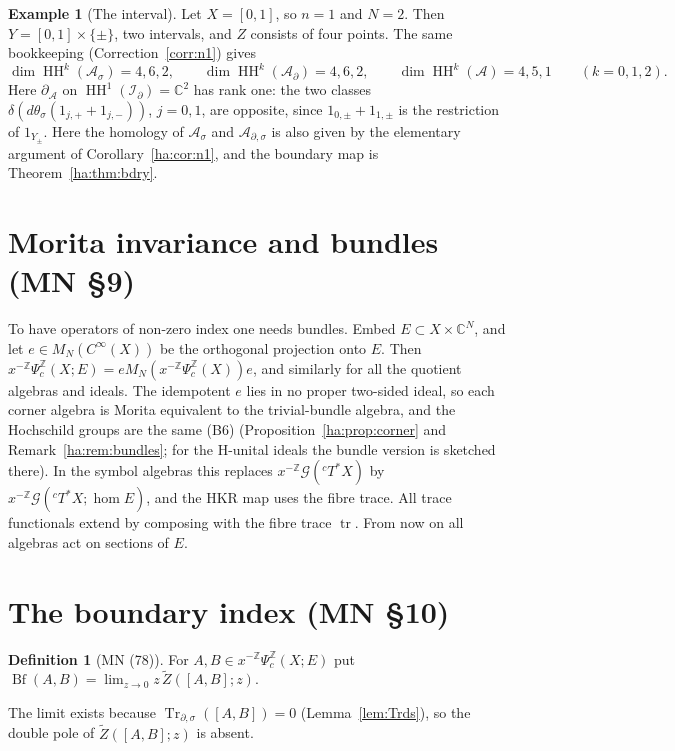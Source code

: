 \documentclass[11pt,oneside,reqno]{article}
\DeclareMathOperator{\HH}{HH}
\DeclareMathOperator{\Tr}{Tr}
\DeclareMathOperator{\tr}{tr}
\DeclareMathOperator{\Bf}{Bf}
\newcommand{\C}{\mathbb C}
\newcommand{\Z}{\mathbb Z}
\newcommand{\cA}{\mathcal A}
\newcommand{\Id}{\mathcal I_\partial}
\newcommand{\As}{\mathcal A_\sigma}
\newcommand{\Ad}{\mathcal A_\partial}
\newcommand{\Ads}{\mathcal A_{\partial,\sigma}}
\newcommand{\Psic}{\Psi_{c}}
\newcommand{\Trds}{\Tr_{\partial,\sigma}}
\newcommand{\CI}{C^\infty}
\newcommand{\cT}{{}^cT^*X}
\theoremstyle{plain}
\theoremstyle{definition}
\newtheorem{definition}[theorem]{Definition}
\newtheorem{example}[theorem]{Example}
\theoremstyle{remark}
\begin{document}
\begin{example}[The interval]\label{ex:intervalHH}
Let \(X=[0,1]\), so \(n=1\) and \(N=2\). Then \(Y=[0,1]\times\{\pm\}\), two
intervals, and \(Z\) consists of four points. The same bookkeeping
(Correction~\ref{corr:n1}) gives
\[
 \dim\HH^k(\As)=4,6,2,\qquad\dim\HH^k(\Ad)=4,6,2,\qquad
 \dim\HH^k(\cA)=4,5,1\qquad(k=0,1,2).
\]
Here \(\partial_{\cA}\) on \(\HH^1(\Id)=\C^2\) has rank one: the two
classes \(\delta(d\theta_\sigma(1_{j,+}+1_{j,-}))\), \(j=0,1\), are
opposite, since \(1_{0,\pm}+1_{1,\pm}\) is the restriction of
\(1_{Y_\pm}\). Here the homology of \(\As\) and \(\Ads\) is also given by
the elementary argument of Corollary~\ref{ha:cor:n1}, and the boundary
map is Theorem~\ref{ha:thm:bdry}.
\end{example}

\section{Morita invariance and bundles (MN \S9)}\label{sec:morita}

To have operators of non-zero index one needs bundles. Embed
\(E\subset X\times\C^N\), and let \(e\in M_N(\CI(X))\) be the orthogonal
projection onto \(E\). Then \(x^{-\Z}\Psic^{\Z}(X;E)=eM_N(x^{-\Z}
\Psic^{\Z}(X))e\), and similarly for all the quotient algebras and ideals.
The idempotent \(e\) lies in no proper two-sided ideal, so each corner
algebra is Morita equivalent to the trivial-bundle algebra, and the
Hochschild groups are the same (B6) \cite[Prop.~13]{MN}
(Proposition~\ref{ha:prop:corner} and Remark~\ref{ha:rem:bundles}; for the
H-unital ideals the bundle version is sketched there). In the symbol
algebras this replaces \(x^{-\Z}\mathcal G(\cT)\) by
\(x^{-\Z}\mathcal G(\cT;\hom E)\), and the HKR map uses the fibre trace.
All trace functionals extend by composing with the fibre trace \(\tr\).
From now on all algebras act on sections of \(E\).

\section{The boundary index (MN \S10)}\label{sec:boundaryindex}

\begin{definition}[MN (78)]
For \(A,B\in x^{-\Z}\Psic^{\Z}(X;E)\) put
\(\Bf(A,B)=\lim_{z\to0}z\,\widetilde Z([A,B];z)\).
\end{definition}

The limit exists because \(\Trds([A,B])=0\) (Lemma~\ref{lem:Trds}), so the
double pole of \(\widetilde Z([A,B];z)\) is absent.
\end{document}
